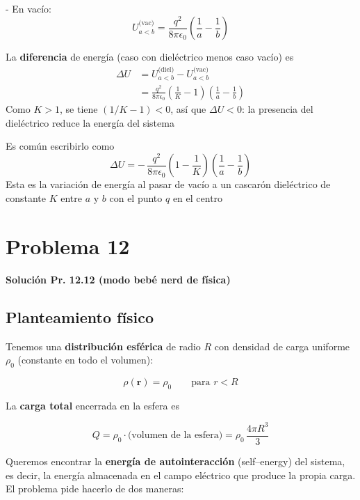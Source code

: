 \documentclass{article}
\begin{document}
- En vacío:
\[
U_{a<b}^{\text{(vac)}} = \frac{q^{2}}{8\pi\epsilon_{0}}\left(\frac{1}{a} - \frac{1}{b}\right)
\]

La \textbf{diferencia} de energía (caso con dieléctrico menos caso vacío) es
\begin{align}
\Delta U &= U_{a<b}^{\text{(diel)}} - U_{a<b}^{\text{(vac)}}\\[4pt]
&= \frac{q^{2}}{8\pi\epsilon_{0}}\left(\frac{1}{K} - 1\right)
\left(\frac{1}{a} - \frac{1}{b}\right)
\label{eq:DeltaU-K}
\end{align}
Como $K>1$, se tiene $(1/K - 1)<0$, así que $\Delta U<0$: la presencia del dieléctrico reduce la energía del sistema

Es común escribirlo como
\begin{equation}
\boxed{
\Delta U 
= -\,\frac{q^{2}}{8\pi\epsilon_{0}}
\left(1 - \frac{1}{K}\right)
\left(\frac{1}{a} - \frac{1}{b}\right)
}
\label{eq:DeltaU-final}
\end{equation}
Esta es la variación de energía al pasar de vacío a un cascarón dieléctrico de constante $K$ entre $a$ y $b$ con el punto $q$ en el centro


\section{Problema 12}

\textcolor{Cinnabar}{\textbf{Solución Pr. 12.12 (modo bebé nerd de física)}} \vspace{0.4cm}

\subsection*{Planteamiento físico}

Tenemos una \textbf{distribución esférica} de radio $R$ con densidad de carga uniforme $\rho_{0}$ (constante en todo el volumen):

\[
\rho(\mathbf{r}) = \rho_{0}
\qquad \text{para } r<R
\]

La \textbf{carga total} encerrada en la esfera es

\begin{equation}
Q = \rho_{0} \cdot \text{(volumen de la esfera)} 
= \rho_{0}\,\frac{4\pi R^{3}}{3}
\label{eq:Q-total}
\end{equation}

Queremos encontrar la \textbf{energía de autointeracción} (self–energy) del sistema, es decir, la energía almacenada en el campo eléctrico que produce la propia carga. El problema pide hacerlo de dos maneras:
\end{document}
